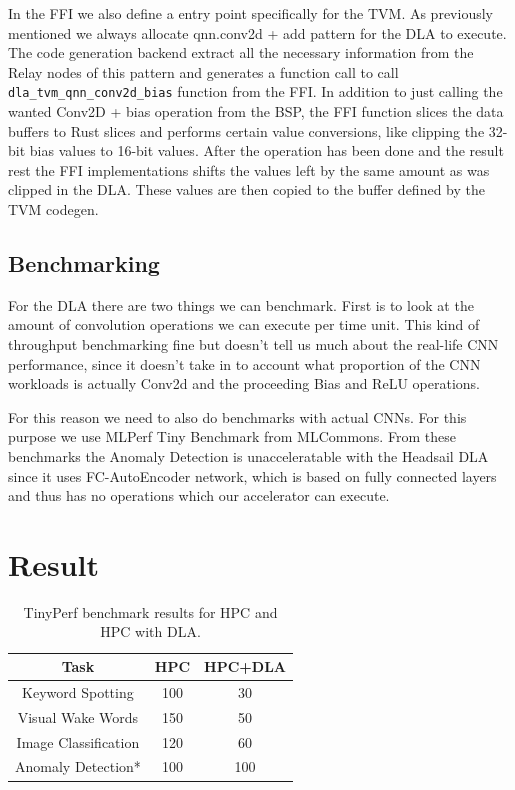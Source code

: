 \documentclass[12pt,a4paper,english
]{tunithesis}
\begin{document}
In the FFI we also define a entry point specifically for the TVM. As previously mentioned we always allocate qnn.conv2d + add pattern for the DLA to execute. The code generation backend extract all the necessary information from the Relay nodes of this pattern and generates a function call to call \texttt{dla\_tvm\_qnn\_conv2d\_bias} function from the FFI. In addition to just calling the wanted Conv2D + bias operation from the BSP, the FFI function slices the data buffers to Rust slices and performs certain value conversions, like clipping the 32-bit bias values to 16-bit values. After the operation has been done and the result rest the FFI implementations shifts the values left by the same amount as was clipped in the DLA. These values are then copied to the buffer defined by the TVM codegen.

\section{Benchmarking}
For the DLA there are two things we can benchmark. First is to look at the amount of convolution operations we can execute per time unit. This kind of throughput benchmarking fine but doesn't tell us much about the real-life CNN performance, since it doesn't take in to account what proportion of the CNN workloads is actually Conv2d and the proceeding Bias and ReLU operations.

For this reason we need to also do benchmarks with actual CNNs. For this purpose we use MLPerf Tiny Benchmark from MLCommons.
From these benchmarks the Anomaly Detection is unacceleratable with the Headsail DLA since it uses FC-AutoEncoder network, which is based on fully connected layers and thus has no operations which our accelerator can execute.

\chapter{Result}
\begin{table}[h]
\centering
\begin{tabular}{|c|c|c|}
\hline
\textbf{Task} & \textbf{HPC} & \textbf{HPC+DLA} \\ \hline
Keyword Spotting & 100 &  30 \\ \hline
Visual Wake Words & 150 & 50 \\ \hline
Image Classification &  120 & 60  \\ \hline
Anomaly Detection* & 100  & 100  \\ \hline
\end{tabular}
\caption{TinyPerf benchmark results for HPC and HPC with DLA.}
\label{tab:benchmark-results}
\end{table}
\end{document}
